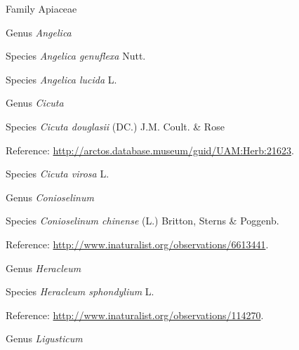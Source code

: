 \documentclass[9pt, article]{memoir}
\begin{document}
\begin{multicols}{2}
\vspace{6pt}\noindent\hspace{24pt}Family Apiaceae


\vspace{6pt}\noindent\hspace{30pt}Genus \textit{Angelica}


\vspace{6pt}\noindent\hspace{36pt}Species \textit{Angelica genuflexa} Nutt.


\vspace{6pt}\noindent\hspace{36pt}Species \textit{Angelica lucida} L.


\vspace{6pt}\noindent\hspace{30pt}Genus \textit{Cicuta}


\vspace{6pt}\noindent\hspace{36pt}Species \textit{Cicuta douglasii} (DC.) J.M. Coult. \& Rose


\vspace{6pt}Reference: 
\url{http://arctos.database.museum/guid/UAM:Herb:21623}.

\vspace{6pt}\noindent\hspace{36pt}Species \textit{Cicuta virosa} L.


\vspace{6pt}\noindent\hspace{30pt}Genus \textit{Conioselinum}


\vspace{6pt}\noindent\hspace{36pt}Species \textit{Conioselinum chinense} (L.) Britton, Sterns \& Poggenb.


\vspace{6pt}Reference: 
\url{http://www.inaturalist.org/observations/6613441}.

\vspace{6pt}\noindent\hspace{30pt}Genus \textit{Heracleum}


\vspace{6pt}\noindent\hspace{36pt}Species \textit{Heracleum sphondylium} L.


\vspace{6pt}Reference: 
\url{http://www.inaturalist.org/observations/114270}.

\vspace{6pt}\noindent\hspace{30pt}Genus \textit{Ligusticum}



\end{multicols}
\end{document}
